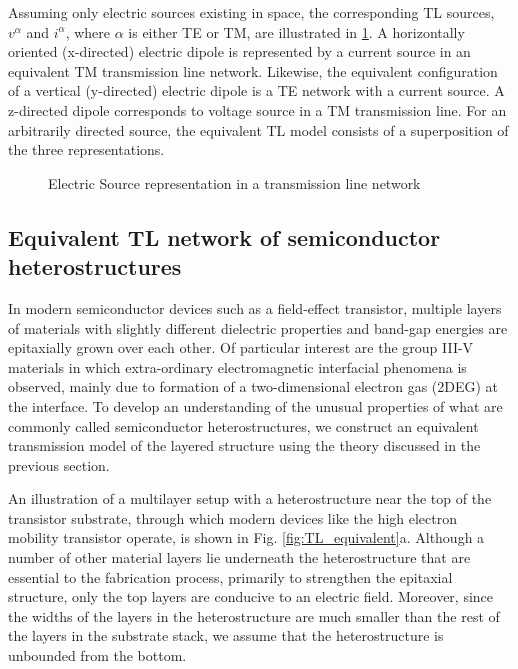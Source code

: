 \documentclass[12pt]{article}
\begin{document}
%
Assuming only electric sources existing in space, the corresponding TL sources, $v^{\alpha}$ and $i^{\alpha}$, where $\alpha$ is either TE or TM, are illustrated in \ref{fig:J_sources}. A horizontally oriented (x-directed) electric dipole is represented by a current source in an equivalent TM transmission line network. Likewise, the equivalent configuration of a vertical (y-directed) electric dipole is a TE network with a current source. A z-directed dipole corresponds to voltage source in a TM transmission line. For an arbitrarily directed source, the equivalent TL model consists of a superposition of the three representations.
%
\begin{figure}[h]
  \centering
    \newline
    \newline \centering
   \newline
  \caption{Electric Source representation in a transmission line network}
  \label{fig:J_sources}
\end{figure}
\subsection{Equivalent TL network of semiconductor heterostructures}
%
In modern semiconductor devices such as a field-effect transistor, multiple layers of materials with slightly different dielectric properties and band-gap energies are epitaxially grown over each other. Of particular interest are the group III-V materials in which extra-ordinary electromagnetic interfacial phenomena is observed, mainly due to formation of a two-dimensional electron gas (2DEG) at the interface. To develop an understanding of the unusual properties of what are commonly called semiconductor heterostructures, we construct an equivalent transmission model of the layered structure using the theory discussed in the previous section.

An illustration of a multilayer setup with a heterostructure near the top of the transistor substrate, through which modern devices like the high electron mobility transistor operate, is shown in Fig. \ref{fig:TL_equivalent}a. Although a number of other material layers lie underneath the heterostructure that are essential to the fabrication process, primarily to strengthen the epitaxial structure, only the top layers are conducive to an electric field. Moreover, since the widths of the layers in the heterostructure are much smaller than the rest of the layers in the substrate stack, we assume that the heterostructure is unbounded from the bottom.
\end{document}
